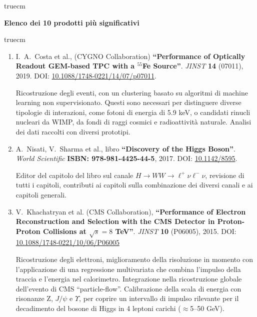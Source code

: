 \documentclass[11pt,twoside,a4paper]{article}
\begin{document}
 truecm
\begin{center}
{\bf{Elenco dei 10 prodotti pi\`u significativi}}
\end{center}
 truecm

\begin{enumerate}

\item I.~A.~Costa et al., (CYGNO Collaboration) \textbf{``Performance
  of Optically Readout GEM-based TPC with a $^{55}$Fe
  Source''}. \textit{JINST} \textbf{14} (07011), 2019. DOI:
  \href{https://iopscience.iop.org/article/10.1088/1748-0221/14/07/P07011}{10.1088/1748-0221/14/07/p07011}.

  Ricostruzione degli eventi, con un clustering basato su algoritmi di
  machine learning non supervisionato.  Questi sono necessari per
  distinguere diverse tipologie di interazioni, come fotoni di energia
  di 5.9 keV, o candidati rinucli nucleari da WIMP, da fondi di raggi
  cosmici e radioattivit\`a naturale. Analisi dei dati raccolti con
  diversi prototipi.

\item A.~Nisati, V.~Sharma et al., libro \textbf{``Discovery of the
  Higgs Boson''}. \textit{World Scientific} \textbf{ISBN:
  978-981-4425-44-5}, 2017. DOI:
  \href{https://www.worldscientific.com/worldscibooks/10.1142/8595}{10.1142/8595}.

  Editor del capitolo del libro sul canale $H\to
  WW\to\ell^+\nu\ell^-\nu$, revisione di tutti i capitoli, contributi
  ai capitoli sulla combinazione dei diversi canali e ai capitoli
  generali.

\item V.~Khachatryan et al. (CMS Collaboration), \textbf{``Performance
  of Electron Reconstruction and Selection with the CMS Detector in
  Proton-Proton Collisions at $\sqrt{s} = 8$ TeV''}. \textit{JINST}
  \textbf{10} (P06005), 2015. DOI:
  \href{https://iopscience.iop.org/article/10.1088/1748-0221/10/06/P06005}{10.1088/1748-0221/10/06/P06005}
  
  Ricostruzione degli elettroni, miglioramento della risoluzione in
  momento con l'applicazione di una regressione multivariata che
  combina l'impulso della traccia e l'energia nel
  calorimetro. Integrazione nella ricostruzione globale dell'evento
  di CMS ``particle-flow''. Calibrazione della scala di energia con
  risonanze Z, $J/\psi$ e $\Upsilon$, per coprire un intervallo di
  impulso rilevante per il decadimento del bosone di Higgs in 4
  leptoni carichi ($\approx$5--50 GeV).


\end{enumerate}
\end{document}
